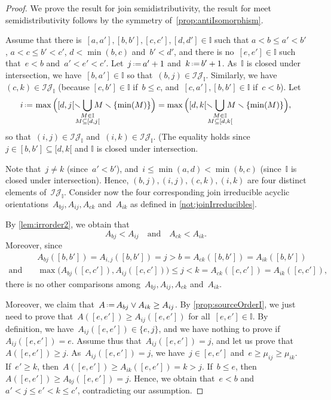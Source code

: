 \documentclass[reqno]{amsart}
\theoremstyle{definition}
\newcommand{\cal}[1]{\mathcal{#1}} %
\newcommand{\ssm}{\smallsetminus} %
\newcommand{\eqdef}{\mbox{\,\raisebox{0.2ex}{\scriptsize\ensuremath{\mathrm:}}\ensuremath{=}\,}} %
\newcommand{\vincent}[1]{\todo[size=\tiny,color=blue!30]{ #1 \\ \hfill --- V.}\,}
\newcommand{\join}{\vee} %
\newcommand{\II}{\mathbb I} %
\newcommand{\cIJ}{\cal{IJ}} %
\begin{document}
\begin{proof}
We prove the result for join semidistributivity, the result for meet semidistributivity follows by the symmetry of~\cref{prop:antiIsomorphism}.

Assume that there is~$[a,a'], [b,b'], [c,c'], [d,d'] \in \II$ such that $a < b \le a' < b'$, $a < c \le b' < c'$, $d < \min(b, c)$ and~$b' < d'$, and there is no~$[e,e'] \in \II$ such that~$e < b$ and~$a' < e' < c'$.
Let~$j \eqdef a'+1$ and~$k \eqdef b'+1$.
As~$\II$ is closed under intersection, we have~$[b,a'] \in \II$ so that~$(b,j) \in \cIJ_\II$.
Similarly, we have~$(c,k) \in \cIJ_\II$ (because $[c,b'] \in \II$ if~$b \le c$, and~$[c,a'], [b,b'] \in \II$ if~$c < b$).
Let
\[
i \eqdef \max \Big( [d,j[ \ssm \!\!\!\!\! \bigcup_{\substack{M \in \II \\ M \subseteq [d,j[}} \!\!\!\!\! M \ssm \{\min(M)\} \Big) = \max \Big( [d,k[ \ssm \!\!\!\!\! \bigcup_{\substack{M \in \II \\ M \subseteq [d,k[}} \!\!\!\!\! M \ssm \{\min(M)\} \Big),
\]
so that~$(i,j) \in \cIJ_\II$ and~$(i,k) \in \cIJ_\II$.
(The equality holds since $j \in [b,b'] \subseteq [d,k[$ and $\II$ is closed under intersection.

Note that~$j \ne k$ (since~$a' < b'$), and~$i \le \min(a,d) < \min(b,c)$ (since~$\II$ is closed under intersection).
Hence, $(b,j), (i,j), (c,k), (i,k)$ are four distinct elements of~$\cIJ_\II$.
Consider now the four corresponding join irreducible acyclic orientations~$A_{bj}, A_{ij}, A_{ck}$ and~$A_{ik}$ as defined in \cref{not:joinIrreducibles}.

By \cref{lem:irrorder2}, we obtain that
\[
A_{bj} < A_{ij}
\quad\text{and}\quad
A_{ck} < A_{ik}.
\]
Moreover, since
\begin{align*}
& A_{bj}([b,b']) = A_{i,j}([b,b']) = j > b = A_{ck}([b,b']) = A_{ik}([b,b']) \\
\text{and}\quad &
\max \big( A_{bj}([c,c']), A_{ij}([c,c']) \big) \le j < k = A_{ck}([c,c']) = A_{ik}([c,c']),
\end{align*}
there is no other comparisons among~$A_{bj}, A_{ij}, A_{ck}$ and~$A_{ik}$.

Moreover, we claim that~$A \eqdef A_{bj} \join A_{ik} \ge A_{ij}$.
By \cref{prop:sourceOrderI}, we just need to prove that~$A([e,e']) \ge A_{ij}([e,e'])$ for all~$[e,e'] \in \II$.
By definition, we have~$A_{ij}([e,e']) \in \{e,j\}$, and we have nothing to prove if~$A_{ij}([e,e']) = e$.
Assume thus that~$A_{ij}([e,e']) = j$, and let us prove that~$A([e,e']) \ge j$.
As~$A_{ij}([e,e']) = j$, we have~$j \in [e,e']$ and~$e \ge \mu_{ij} \ge \mu_{ik}$.
If~$e' \ge k$, then~$A([e,e']) \ge A_{ik}([e,e']) = k > j$.
If~$b \le e$, then~$A([e,e']) \ge A_{bj}([e,e']) = j$.
Hence, we obtain that~$e < b$ and~$a' < j \le e' < k \le c'$, contradicting our assumption.


\end{proof}
\end{document}
